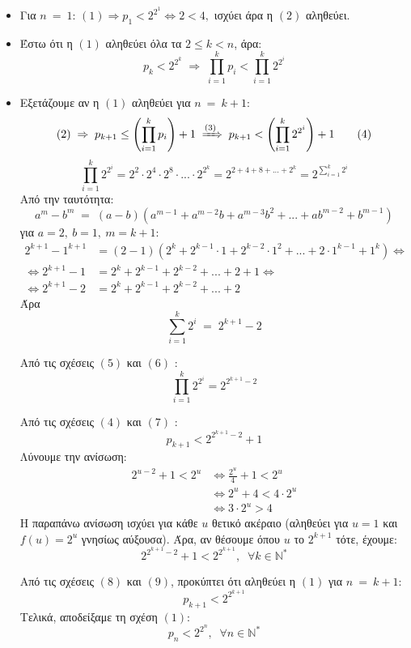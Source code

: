 \documentclass[12pt]{article}
\begin{document}
\begin{itemize}
	\item Για $n\:=\:1$: $(1) \Rightarrow p_1 < 
	2^{2^1} \Leftrightarrow 2 < 4,$ ισχύει άρα η $(2)$ αληθεύει.
	\item Έστω ότι η $(1)$ αληθεύει όλα τα $2 \leq k < n$, άρα:
	\[
	 p_k < 2^{2^k}\; \Rightarrow \;
	 \prod_{i=1}^{k}p_i < \prod_{i=1}^{k}2^{2^i} \tag{3}
	\]
	\item Εξετάζουμε αν η $(1)$ αληθεύει για $n\:=\:k + 1:$
	\[
	 (2)\; \Rightarrow \; p_{k+1} \leq \left(\prod_{i=1}^{k}p_i \right) + 1\; \xRightarrow{(3)}\; p_{k+1} < 
	 \left(\prod_{i=1}^{k}2^{2^i}\right) + 1 \tag{4} 
	\]
	\pagebreak
	\[
	\prod_{i=1}^{k}2^{2^i} = 2^2 \cdot 2^4 \cdot 2^8 \cdot ... \cdot 2^{2^k} = 2^{2 + 4 + 8 + ... + 2^k} = 
	2^{\sum_{i=1}^{k}2^i}	\tag{5}
	\]
	Από την ταυτότητα:
	\[
		a^m - b^m\; = \;(a - b)(a^{m-1} + a^{m-2}b + a^{m-3}b^2 + ... + ab^{m-2} + b^{m-1})
	\]
	για $a = 2,\:b = 1,\: m = k+1$:
	\begin{align*}
		2^{k+1} - 1^{k+1} &=  (2 - 1)(2^k + 2^{k-1}\cdot 1 + 2^{k-2} \cdot 1^2 + ... + 2\cdot 1^{k-1} + 1^{k}) \Leftrightarrow \\
		\Leftrightarrow 2^{k+1} - 1 &= 2^k + 2^{k-1} + 2^{k-2} + ... + 2 + 1 \Leftrightarrow \\
		\Leftrightarrow 2^{k+1} - 2 &= 2^k + 2^{k-1} + 2^{k-2} + ... + 2
	\end{align*}
	Άρα
	\[
		\sum_{i=1}^{k}2^i\; = \;2^{k+1} - 2 \tag{6}
	\]
	
	\vspace{0.1in}
	Από τις σχέσεις $(5)$ και $(6)$ :
	\[
		\prod_{i=1}^{k}2^{2^i} = 2^{2^{k+1} - 2} \tag{7}
	\]
	
	\vspace{0.1in}
	Από τις σχέσεις $(4)$ και $(7)$ :
	\[
		p_{k+1} < 2^{2^{k+1} - 2} + 1 \tag{8}
	\]
	Λύνουμε την ανίσωση:
	\begin{align*}
		2^{u - 2} + 1 < 2^u &\Leftrightarrow \frac{2^u}{4} + 1 < 2^u \\ 
		&\Leftrightarrow 2^u + 4 < 4 \cdot 2^u \\
		&\Leftrightarrow 3 \cdot 2^u > 4
	\end{align*}
	Η παραπάνω ανίσωση ισχύει για κάθε $u$ θετικό 
	ακέραιο (αληθεύει για $u = 1$ και $f(u) = 2^u$ γνησίως 
	αύξουσα). 
	Άρα, αν θέσουμε όπου $u$ το $2^{k+1}$
	τότε, έχουμε:
	\[
	 2^{2^{k+1} - 2} + 1 < 2^{2^{k+1}},\;\; \forall k \in \mathbb{N}^{*} \tag{9}
	\]
	
	\vspace{0.1in}
	Από τις σχέσεις $(8)$ και $(9)$, προκύπτει ότι 
	αληθεύει η $(1)$ για $n\:=\:k+1$:
	\[
		p_{k+1} < 2^{2^{k+1}}
	\]
	Τελικά, αποδείξαμε τη σχέση $(1)$: 
	\[
		p_n < 2^{2^n},\;\; \forall n \in \mathbb{N}^{*}
	\]
\end{itemize}
\end{document}
